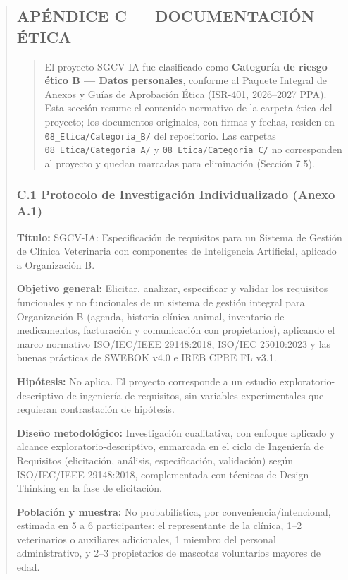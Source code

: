 \documentclass[
]{article}
\begin{document}
\begin{quote}
\subsection{APÉNDICE C --- DOCUMENTACIÓN ÉTICA}\label{apendice-c-documentacion-etica}

\begin{quote}
El proyecto SGCV-IA fue clasificado como \textbf{Categoría de riesgo ético B --- Datos personales}, conforme al Paquete Integral de Anexos y Guías de Aprobación Ética (ISR-401, 2026--2027 PPA). Esta sección resume el contenido normativo de la carpeta ética del proyecto; los documentos originales, con firmas y fechas, residen en \texttt{08\_Etica/Categoria\_B/} del repositorio. Las carpetas \texttt{08\_Etica/Categoria\_A/} y \texttt{08\_Etica/Categoria\_C/} no corresponden al proyecto y quedan marcadas para eliminación (Sección 7.5).
\end{quote}

\subsubsection{C.1 Protocolo de Investigación Individualizado (Anexo A.1)}\label{c1-protocolo-investigacion}

\textbf{Título:} SGCV-IA: Especificación de requisitos para un Sistema de Gestión de Clínica Veterinaria con componentes de Inteligencia Artificial, aplicado a Organización B.

\textbf{Objetivo general:} Elicitar, analizar, especificar y validar los requisitos funcionales y no funcionales de un sistema de gestión integral para Organización B (agenda, historia clínica animal, inventario de medicamentos, facturación y comunicación con propietarios), aplicando el marco normativo ISO/IEC/IEEE 29148:2018, ISO/IEC 25010:2023 y las buenas prácticas de SWEBOK v4.0 e IREB CPRE FL v3.1.

\textbf{Hipótesis:} No aplica. El proyecto corresponde a un estudio exploratorio-descriptivo de ingeniería de requisitos, sin variables experimentales que requieran contrastación de hipótesis.

\textbf{Diseño metodológico:} Investigación cualitativa, con enfoque aplicado y alcance exploratorio-descriptivo, enmarcada en el ciclo de Ingeniería de Requisitos (elicitación, análisis, especificación, validación) según ISO/IEC/IEEE 29148:2018, complementada con técnicas de Design Thinking en la fase de elicitación.

\textbf{Población y muestra:} No probabilística, por conveniencia/intencional, estimada en 5 a 6 participantes: el representante de la clínica, 1--2 veterinarios o auxiliares adicionales, 1 miembro del personal administrativo, y 2--3 propietarios de mascotas voluntarios mayores de edad.


\end{quote}
\end{document}
